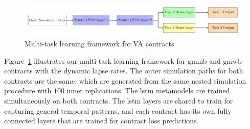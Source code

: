 \begin{figure}[ht!]
    \includegraphics[width=\textwidth]{./project3/tikz/mtl.pdf}
    \caption{Multi-task learning framework for VA contracts}
    \label{fig3:mtl}
\end{figure}

Figure~\ref{fig3:mtl} illustrates our multi-task learning framework for \gls{gmmb} and \gls{gmwb} contracts with the dynamic lapse rates.
The outer simulation paths for both contracts are the same, which are generated from the same nested simulation procedure with $100$ inner replications.
The \gls{lstm} metamodels are trained simultaneously on both contracts.
The \gls{lstm} layers are shared to train for capturing general temporal patterns, and each contract has its own fully connected layers that are trained for contract loss predictions.



